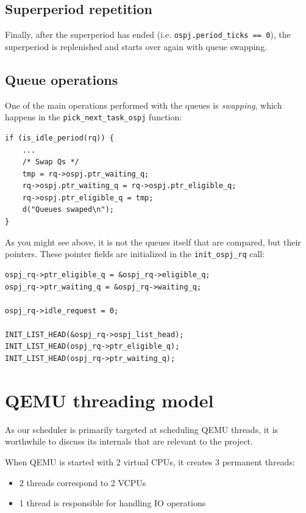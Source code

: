 \documentclass[]{report}
\begin{document}
\subsection{Superperiod repetition}\label{superperiod-repetition}

Finally, after the superperiod has ended (i.e.
\lstinline!ospj.period_ticks == 0!), the superperiod is replenished and
starts over again with queue swapping.

\subsection{Queue operations}\label{queue-operations}

One of the main operations performed with the queues is \emph{swapping},
which happens in the \lstinline!pick_next_task_ospj! function:

\begin{lstlisting}[style=c, caption=ospj.c, firstnumber=242]
if (is_idle_period(rq)) {
    ...
    /* Swap Qs */
    tmp = rq->ospj.ptr_waiting_q;
    rq->ospj.ptr_waiting_q = rq->ospj.ptr_eligible_q;
    rq->ospj.ptr_eligible_q = tmp;
    d("Queues swaped\n");
}
\end{lstlisting}

As you might see above, it is not the queues itself that are compared,
but their pointers. These pointer fields are initialized in the
\lstinline!init_ospj_rq! call:

\begin{lstlisting}[style=c, caption=ospj.c, firstnumber=63]
ospj_rq->ptr_eligible_q = &ospj_rq->eligible_q;
ospj_rq->ptr_waiting_q = &ospj_rq->waiting_q;

ospj_rq->idle_request = 0;

INIT_LIST_HEAD(&ospj_rq->ospj_list_head);
INIT_LIST_HEAD(ospj_rq->ptr_eligible_q);
INIT_LIST_HEAD(ospj_rq->ptr_waiting_q);
\end{lstlisting}

\section{QEMU threading model}\label{qemu-threading-model}

As our scheduler is primarily targeted at scheduling QEMU threads, it is
worthwhile to discuss its internals that are relevant to the project.

When QEMU is started with 2 virtual CPUs, it creates 3 permanent
threads:

\begin{itemize}
\itemsep1pt\parskip0pt
\item
  2 threads correspond to 2 VCPUs
\item
  1 thread is responsible for handling IO operations
\end{itemize}
\end{document}
